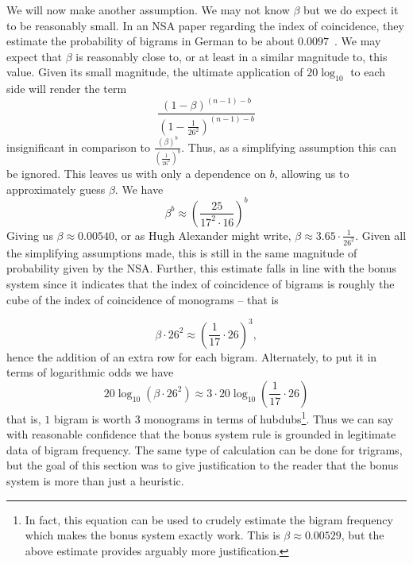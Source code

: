 

\noindent We will now make another assumption. We may not know
$\beta$ but we do expect it to be reasonably small. In an NSA paper
regarding the index of coincidence, they estimate the probability of
bigrams in German to be about $0.0097$~\cite[p.~4]{Friedman1944}. We may expect that $\beta$ is
reasonably close to, or at least in a similar magnitude to, this value.
Given its small magnitude, the ultimate application of
$20\log_{10}$ to each side will render the term
\[
  \frac{(1-\beta)^{(n-1)-b}}{(1-\frac{1}{26^2})^{(n-1)-b}}
\]
insignificant in comparison to
$\frac{(\beta)^b}{(\frac{1}{26^2})^b}$. Thus, as a simplifying
assumption this can be ignored.
This leaves us with only a dependence on $b$, allowing us to
approximately guess $\beta$. We have
\[
  \beta^b \approx
  (\frac{25}{17^2\cdot16})^b
\]
Giving us $\beta \approx 0.00540$, or as Hugh Alexander might
write, $\beta \approx 3.65\cdot\frac{1}{26^2}$. Given all the
simplifying assumptions made, this is still in the same magnitude
of probability given by the NSA. Further, this estimate falls in
line with the bonus system since it indicates that the index of
coincidence of bigrams is roughly the cube of the index of
coincidence of monograms -- that is

\[
  \beta\cdot26^2 \approx (\frac{1}{17}\cdot26)^3,
\]
hence the addition of an extra row for each bigram. Alternately, to
put it in terms of
logarithmic odds we have
\[
  20\log_{10}(\beta\cdot26^2) \approx 3\cdot20\log_{10}(\frac{1}{17}\cdot26)
\]
that is, $1$ bigram is worth $3$ monograms in terms of
hubdubs\footnote{In fact, this equation can be used to crudely
  estimate the bigram frequency which makes the bonus system exactly
  work. This is $\beta\approx0.00529$, but the above estimate
provides arguably more justification.}. Thus we can say with reasonable
confidence that the bonus system rule is grounded in legitimate
data of bigram frequency. The same type of calculation can be done
for trigrams, but the goal of this section was to give justification
to the reader that the bonus system is more than just a heuristic.

